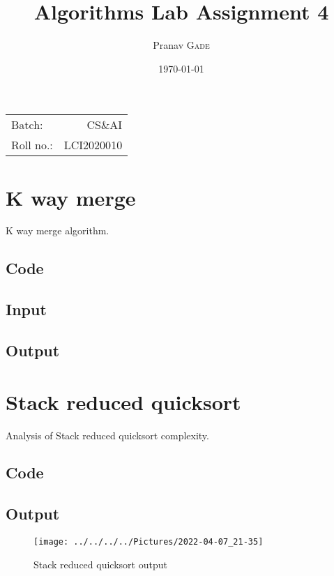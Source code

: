 \documentclass{article}
\title{Algorithms Lab Assignment 4} %
\author{Pranav \textsc{Gade}} %
\date{\today} %
\begin{document}
    \maketitle %

    \begin{center}
        \begin{tabular}{l r}
            Batch:    & CS\&AI     \\
            Roll no.: & LCI2020010
        \end{tabular}
    \end{center}


    \section{K way merge}
    K way merge algorithm.
    \subsection{Code}
    

    \subsection{Input}
    

    \subsection{Output}
    

    \section{Stack reduced quicksort}
    Analysis of Stack reduced quicksort complexity.
    \subsection{Code}
    

    \subsection{Output}
    \begin{figure}[H]
        \centering
        \texttt{[image: ../../../../Pictures/2022-04-07\_21-35]}
        \caption{Stack reduced quicksort output}
    \end{figure}
\end{document}
